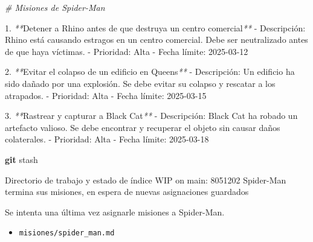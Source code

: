 \documentclass[
]{book}
\newenvironment{Shaded}{\begin{snugshade}}{\end{snugshade}}
\newcommand{\CommentTok}[1]{\textcolor[rgb]{0.56,0.35,0.01}{\textit{#1}}}
\newcommand{\ExtensionTok}[1]{#1}
\newcommand{\FunctionTok}[1]{\textcolor[rgb]{0.13,0.29,0.53}{\textbf{#1}}}
\newcommand{\NormalTok}[1]{#1}
\newcommand{\PreprocessorTok}[1]{\textcolor[rgb]{0.56,0.35,0.01}{\textit{#1}}}
\providecommand{\tightlist}{%
  \setlength{\itemsep}{0pt}\setlength{\parskip}{0pt}}
\begin{document}
\begin{Shaded}
\begin{Highlighting}[]
\CommentTok{\# Misiones de Spider{-}Man}

\ExtensionTok{1.} \PreprocessorTok{**}\NormalTok{Detener a Rhino antes de que destruya un centro comercial}\PreprocessorTok{**}
   \ExtensionTok{{-}}\NormalTok{ Descripción: Rhino está causando estragos en un centro comercial. Debe ser neutralizado antes de que haya víctimas.}
   \ExtensionTok{{-}}\NormalTok{ Prioridad: Alta}
   \ExtensionTok{{-}}\NormalTok{ Fecha límite: 2025{-}03{-}12}

\ExtensionTok{2.} \PreprocessorTok{**}\NormalTok{Evitar el colapso de un edificio en Queens}\PreprocessorTok{**}
   \ExtensionTok{{-}}\NormalTok{ Descripción: Un edificio ha sido dañado por una explosión. Se debe evitar su colapso y rescatar a los atrapados.}
   \ExtensionTok{{-}}\NormalTok{ Prioridad: Alta}
   \ExtensionTok{{-}}\NormalTok{ Fecha límite: 2025{-}03{-}15}

\ExtensionTok{3.} \PreprocessorTok{**}\NormalTok{Rastrear y capturar a Black Cat}\PreprocessorTok{**}
   \ExtensionTok{{-}}\NormalTok{ Descripción: Black Cat ha robado un artefacto valioso. Se debe encontrar y recuperar el objeto sin causar daños colaterales.}
   \ExtensionTok{{-}}\NormalTok{ Prioridad: Alta}
   \ExtensionTok{{-}}\NormalTok{ Fecha límite: 2025{-}03{-}18}
\end{Highlighting}
\end{Shaded}

\begin{Shaded}
\begin{Highlighting}[]
\FunctionTok{git}\NormalTok{ stash}
\end{Highlighting}
\end{Shaded}

\begin{Shaded}
\begin{Highlighting}[]
\ExtensionTok{Directorio}\NormalTok{ de trabajo y estado de índice WIP on main: 8051202 Spider{-}Man termina sus misiones, en espera de nuevas asignaciones guardados}
\end{Highlighting}
\end{Shaded}

Se intenta una última vez asignarle misiones a Spider-Man.

\begin{itemize}
\tightlist
\item
  \texttt{misiones/spider\_man.md}
\end{itemize}
\end{document}

